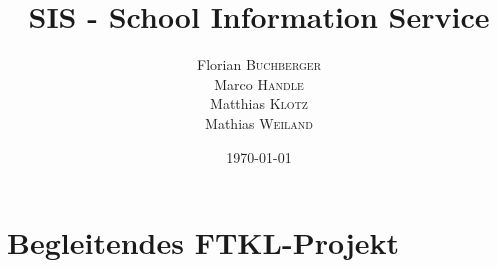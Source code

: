 \documentclass[12pt, oneside, titlepage, a4paper]{book}
\title{SIS - School Information Service}
\author{
Florian \textsc{Buchberger} \\
Marco \textsc{Handle} \\
Matthias \textsc{Klotz} \\
Mathias \textsc{Weiland}}
\date{\today}
\begin{document}
\frontmatter

\maketitle


\newpage

\tableofcontents



\mainmatter




\appendix 
%
%

\chapter{Begleitendes FTKL-Projekt}
\label{sec:report}







\listoffigures
\lstlistoflistings
\listoftables

\nocite{*}
{}


\backmatter 
\end{document}
